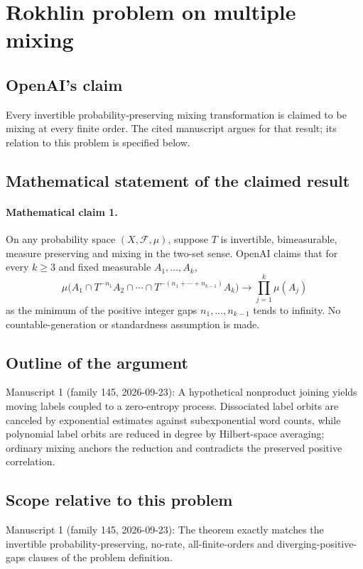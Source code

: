\documentclass[11pt]{article}
\begin{document}
\section*{Rokhlin problem on multiple mixing}

\subsection{OpenAI's claim}
Every invertible probability-preserving mixing transformation is claimed to be mixing at every finite order. The cited manuscript argues for that result; its relation to this problem is specified below.

\subsection{Mathematical statement of the claimed result}
\paragraph{Mathematical claim 1.} On any probability space $(X,\mathcal F,\mu)$, suppose $T$ is invertible, bimeasurable, measure preserving and mixing in the two-set sense. OpenAI claims that for every $k\ge3$ and fixed measurable $A_1,\ldots,A_k$,
\[
\mu\bigl(A_1\cap T^{-n_1}A_2\cap\cdots\cap T^{-(n_1+\cdots+n_{k-1})}A_k\bigr)
\longrightarrow\prod_{j=1}^k\mu(A_j)
\]
as the minimum of the positive integer gaps $n_1,\ldots,n_{k-1}$ tends to infinity. No countable-generation or standardness assumption is made.

\subsection{Outline of the argument}
Manuscript 1 (family 145, 2026-09-23): A hypothetical nonproduct joining yields moving labels coupled to a zero-entropy process. Dissociated label orbits are canceled by exponential estimates against subexponential word counts, while polynomial label orbits are reduced in degree by Hilbert-space averaging; ordinary mixing anchors the reduction and contradicts the preserved positive correlation.

\subsection{Scope relative to this problem}
Manuscript 1 (family 145, 2026-09-23): The theorem exactly matches the invertible probability-preserving, no-rate, all-finite-orders and diverging-positive-gaps clauses of the problem definition.
\end{document}

